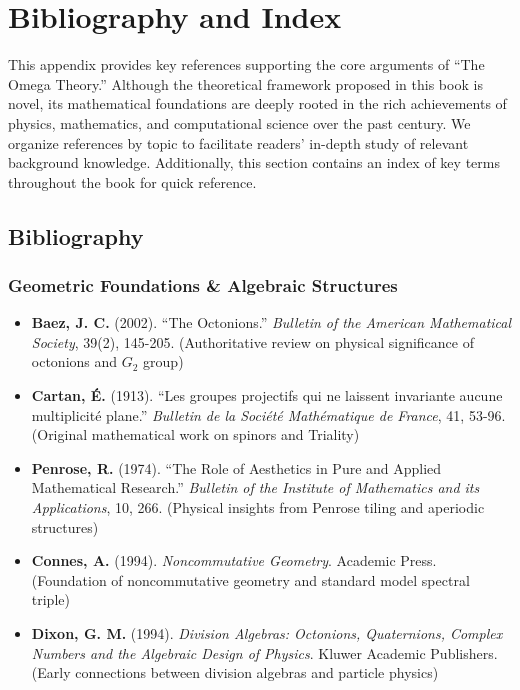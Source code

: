 \section{Bibliography and Index}

This appendix provides key references supporting the core arguments of ``The Omega Theory.'' Although the theoretical framework proposed in this book is novel, its mathematical foundations are deeply rooted in the rich achievements of physics, mathematics, and computational science over the past century. We organize references by topic to facilitate readers' in-depth study of relevant background knowledge. Additionally, this section contains an index of key terms throughout the book for quick reference.

\subsection{Bibliography}

\subsubsection{Geometric Foundations \& Algebraic Structures}

\begin{itemize}
\item \textbf{Baez, J. C.} (2002). ``The Octonions.'' \textit{Bulletin of the American Mathematical Society}, 39(2), 145-205. (Authoritative review on physical significance of octonions and $G_2$ group)
\item \textbf{Cartan, \'{E}.} (1913). ``Les groupes projectifs qui ne laissent invariante aucune multiplicit\'{e} plane.'' \textit{Bulletin de la Soci\'{e}t\'{e} Math\'{e}matique de France}, 41, 53-96. (Original mathematical work on spinors and Triality)
\item \textbf{Penrose, R.} (1974). ``The Role of Aesthetics in Pure and Applied Mathematical Research.'' \textit{Bulletin of the Institute of Mathematics and its Applications}, 10, 266. (Physical insights from Penrose tiling and aperiodic structures)
\item \textbf{Connes, A.} (1994). \textit{Noncommutative Geometry}. Academic Press. (Foundation of noncommutative geometry and standard model spectral triple)
\item \textbf{Dixon, G. M.} (1994). \textit{Division Algebras: Octonions, Quaternions, Complex Numbers and the Algebraic Design of Physics}. Kluwer Academic Publishers. (Early connections between division algebras and particle physics)
\end{itemize}

